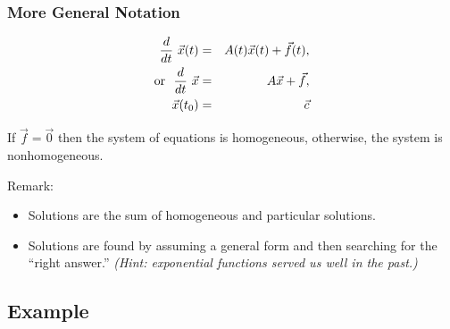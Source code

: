 \begin{frame}
  \frametitle{More General Notation}

  \begin{eqnarray*}
    \deriv{~}{t} \vec{x}(t) & = & A(t) \vec{x}(t) + \vec{f}(t), \\
    \mathrm{or}~~\deriv{~}{t} \vec{x} & = & A \vec{x} + \vec{f}, \\
    \vec{x}(t_0) & = & \vec{c} 
  \end{eqnarray*}

  If $\vec{f}=\vec{0}$ then the system of equations is
  {\color{red}homogeneous}, otherwise, the system is
  {\color{red}nonhomogeneous}.

  {\color{blue}Remark:} 
  \begin{itemize}
  \item Solutions are the sum of homogeneous and particular solutions.
  \item Solutions are found by assuming a general form and then
    searching for the ``right answer.'' \textit{(Hint: exponential
      functions served us well in the past.)}
  \end{itemize}

\end{frame}

\subsection{Example}

